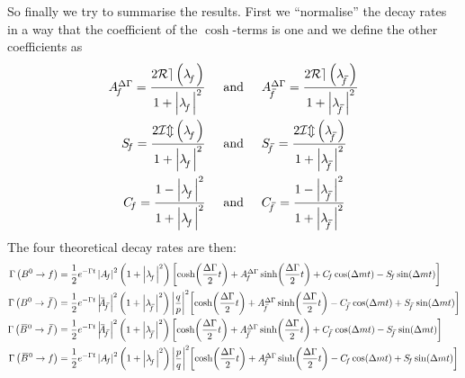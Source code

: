 So finally we try to summarise the results. First we \enquote{normalise} the decay rates in a way that the coefficient of the $\cosh$-terms is one and we
define the other coefficients as
\begin{align}
  \ADGf = \frac{2\mathcal{Re}\left(\Lf\right)}{1+\left|\Lf\right|^2} \hspace{0.5cm} &\text{and} \hspace{0.5cm}
  \ADGfbar = \frac{2\mathcal{Re}\left(\Lfbar \right)}{1+\left|\Lfbar \right|^2}\nonumber\\
  \Sf = \frac{2\mathcal{Im}\left(\Lf\right)}{1+\left|\Lf\right|^2} \hspace{0.5cm} &\text{and} \hspace{0.5cm}
  \Sfbar = \frac{2\mathcal{Im}\left(\Lfbar \right)}{1+\left|\Lfbar \right|^2}\nonumber\\
  \Cf = \frac{1-\left|\Lf\right|^2}{1+\left|\Lf\right|^2} \hspace{0.5cm} &\text{and} \hspace{0.5cm}
  \Cfbar = \frac{1-\left|\Lfbar \right|^2}{1+\left|\Lfbar \right|^2}\nonumber
\end{align}
The four theoretical decay rates are then:
\begin{align}
  \Gamma\left(\Bz\to f\right) &= \frac{1}{2}e^{-\Gamma t}\left| \Af \right|^2 \left(1+\left|\Lf\right|^2\right)\left[
  \cosh\!\left(\frac{\Delta\Gamma}{2}t\right)+\ADGf\sinh\!\left(\frac{\Delta\Gamma}{2}t\right)+\Cf\cos\!\left(\Delta mt\right)
  -\Sf\sin\!\left(\Delta mt\right)\right] \label{eq:theodecrate1}\\
  \Gamma\left(\Bz\to \fbar\right) &= \frac{1}{2}e^{-\Gamma t}\left| \Abarfbar  \right|^2
  \left(1+\left|\Lfbar \right|^2\right) \left|\frac{q}{p}\right|^2\!
  \left[\cosh\!\left(\frac{\Delta\Gamma}{2}t\right)+\ADGfbar\sinh\!\left(\frac{\Delta\Gamma}{2}t\right)
  -\Cfbar\cos\!\left(\Delta mt\right)+\Sfbar\sin\!\left(\Delta mt\right)\right]\label{eq:theodecrate2}\\
  \Gamma\left(\Bzb\to \fbar\right) &= \frac{1}{2}e^{-\Gamma t}\left| \Abarfbar  \right|^2
  \left(1+\left|\Lfbar \right|^2\right)
  \left[\cosh\!\left(\frac{\Delta\Gamma}{2}t\right)+\ADGfbar\sinh\!\left(\frac{\Delta\Gamma}{2}t\right)
  +\Cfbar\cos\!\left(\Delta mt\right)-\Sfbar\sin\!\left(\Delta mt\right)\right]\label{eq:theodecrate3}\\
  \Gamma\left(\Bzb\to f\right) &= \frac{1}{2}e^{-\Gamma t}\left| \Af \right|^2
  \left(1+\left|\Lf\right|^2\right) \left|\frac{p}{q}\right|^2\!
  \left[\cosh\!\left(\frac{\Delta\Gamma}{2}t\right)+\ADGf\sinh\!\left(\frac{\Delta\Gamma}{2}t\right)
  -\Cf\cos\!\left(\Delta mt\right)+\Sf\sin\!\left(\Delta mt\right)\right]\label{eq:theodecrate4}
\end{align}

